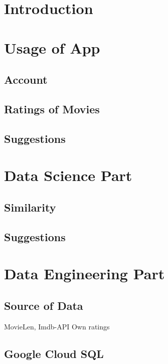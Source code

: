 \documentclass{article}
\begin{document}
\begin{abstract}
\end{abstract}

\tableofcontents

\newpage


\section{Introduction}






\section{Usage of App}

\subsection{Account}


\subsection{Ratings of Movies}

\subsection{Suggestions}



\section{Data Science Part}

\subsection{Similarity}

\subsection{Suggestions}


\section{Data Engineering Part}

\subsection{Source of Data}

MovieLen, Imdb-API
Own ratings


\subsection{Google Cloud SQL}
\end{document}
